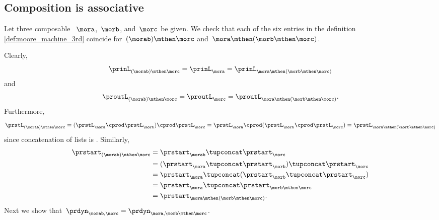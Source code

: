 \subsection{Composition is associative}

Let three composable ~$\mora$,~$\morb$, and~$\morc$ be given.
We check that each of the six entries in the definition \cref{def:moore_machine_3rd} coincide for~$(\morab) \mthen \morc$ and~$\mora \mthen (\morb \mthen \morc)$.

Clearly,
\begin{equation}
    \prinL_{(\morab)\mthen \morc}  = \prinL_{\mora} =\prinL_{\mora \mthen (\morb \mthen \morc)}
\end{equation}
and
\begin{equation}
    \proutL_{(\morab)\mthen \morc}  =\proutL_\morc = \proutL_{\mora \mthen (\morb \mthen \morc)}.
\end{equation}
Furthermore,
\begin{equation}
    \prstL_{(\morab)\mthen \morc} =  (\prstL_{\mora} \cprod \prstL_{\morb}) \cprod  \prstL_{\morc}  =  \prstL_{\mora} \cprod (\prstL_{\morb} \cprod  \prstL_{\morc}) =\prstL_{\mora \mthen (\morb \mthen \morc)}
\end{equation}
since concatenation of lists is .
Similarly,
\begin{equation}
    \begin{aligned}
        \prstart_{(\morab)\mthen \morc} & = \prstart_{\morab} \tupconcat \prstart_{\morc} \\
                                        & =  (\prstart_{\mora } \tupconcat \prstart_{\morb}) \tupconcat \prstart_{\morc} \\
                                        & = \prstart_{\mora } \tupconcat (\prstart_{\morb} \tupconcat \prstart_{\morc}) \\
                                        & = \prstart_{\mora } \tupconcat \prstart_{ \morb \mthen\morc} \\
                                        & = \prstart_{\mora \mthen (\morb \mthen \morc)}.
    \end{aligned}
\end{equation}
Next we show that~$\prdyn_{\morab, \morc} = \prdyn_{\mora, \morb \mthen \morc}$.

